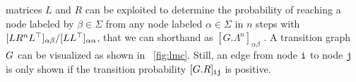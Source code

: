 matrices $L$ and $R$ can be exploited to determine the probability of reaching a node labeled by $\beta\in\Sigma$ from any node labeled $\alpha\in\Sigma$ in $n$ steps with $[LR^nL^\top]_{\alpha\beta}/[LL^\top]_{\alpha\alpha}$, that we can shorthand as $[G.\Lambda^n]_{\alpha\beta}$ \cite{GartnerFW03}.
%
A transition graph $G$ can be visualized as shown in \figurename~\ref{fig:lmc}. Still, %
an edge from node $\textnormal{\texttt{i}}$ to node $\textnormal{\texttt{j}}$ is only shown if the transition probability $[G.R]_{\textnormal{\texttt{i}}\textnormal{\texttt{j}}}$ is positive.

